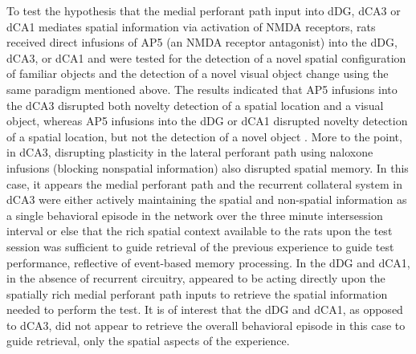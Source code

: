 \documentclass[doc, longtable]{apa6}
\begin{document}
To test the hypothesis that the medial perforant path input into dDG, dCA3 or dCA1 mediates spatial information via activation of NMDA receptors, rats received direct infusions of AP5 (an NMDA receptor antagonist) into the dDG, dCA3, or dCA1 and were tested for the detection of a novel spatial configuration of familiar objects and the detection of a novel visual object change using the same paradigm mentioned above. The results indicated that AP5 infusions into the dCA3 disrupted both novelty detection of a spatial location and a visual object, whereas AP5 infusions into the dDG or dCA1 disrupted novelty detection of a spatial location, but not the detection of a novel object \parencite{Hunsaker2007c}. More to the point, in dCA3, disrupting plasticity in the lateral perforant path using naloxone infusions (blocking nonspatial information) also disrupted spatial memory. In this case, it appears the medial perforant path and the recurrent collateral system in dCA3 were either actively maintaining the spatial and non-spatial information as a single behavioral episode in the network over the three minute intersession interval or else that the rich spatial context available to the rats upon the test session was sufficient to guide retrieval of the previous experience to guide test performance, reflective of event-based memory processing. In the dDG and dCA1, in the absence of recurrent circuitry, appeared to be acting directly upon the spatially rich medial perforant path inputs to retrieve the spatial information needed to perform the test. It is of interest that the dDG and dCA1, as opposed to dCA3, did not appear to retrieve the overall behavioral episode in this case to guide retrieval, only the spatial aspects of the experience. 
\end{document}
